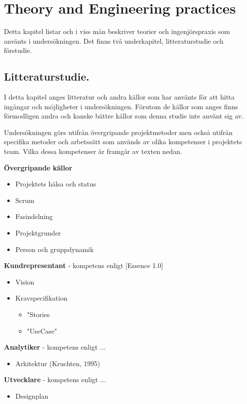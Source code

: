 \section{Theory and Engineering practices}
Detta kapitel listar och i viss mån beskriver teorier och ingenjörspraxis som använts
i undersökningen. Det finns två underkapitel, litteraturstudie och förstudie.

\subsection{Litteraturstudie.}
I detta kapitel anges litteratur och andra källor som har använts för att hitta ingångar
och möjligheter i undersökningen. Förutom de källor som anges finns förmodligen andra 
och kanske bättre källor som denna studie inte använt sig av.

Undersökningen görs utifrån övergripande projektmetoder men också utifrån specifika metoder
och arbetssätt som används av olika kompetenser i projektets team. Vilka dessa kompetenser
är framgår av texten nedan.

\textbf{Övergripande källor}
\begin{itemize}
    \item Projektets hälsa och status
    \item Scrum
    \item Fasindelning
    \item Projektgrunder
    \item Person och gruppdynamik
\end{itemize}

\textbf{Kundrepresentant} - kompetens enligt [Essence 1.0]
\begin{itemize}
    \item Vision
    \item Kravspecifikation
    \begin{itemize}
        \item "Stories
        \item "UseCase"
    \end{itemize}
\end{itemize}

\textbf{Analytiker} - kompetens enligt ...
\begin{itemize}
    \item Arkitektur (Kruchten, 1995)
\end{itemize}

\textbf{Utvecklare} - kompetens enligt ...
\begin{itemize}
    \item Designplan
\end{itemize}

